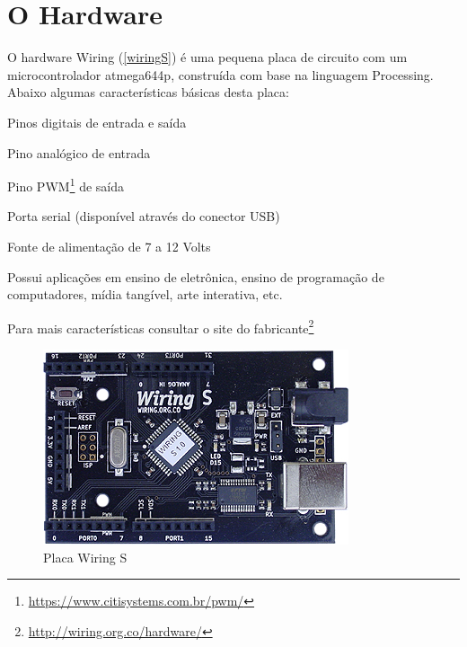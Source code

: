 \section[O Hardware]{O Hardware}

O hardware Wiring (\autoref{wiringS}) é uma pequena placa de circuito com um microcontrolador atmega644p, construída com base na linguagem Processing. Abaixo algumas características básicas desta placa: 

\begin{alineas}
    \item Pinos digitais de entrada e saída
    \item Pino analógico de entrada
    \item Pino PWM\footnote{\url{https://www.citisystems.com.br/pwm/}} de saída
    \item Porta serial (disponível através do conector USB)
    \item Fonte de alimentação de 7 a 12 Volts
\end{alineas}

Possui aplicações em ensino de eletrônica, ensino de programação de computadores, mídia tangível, arte interativa, etc.

Para mais características consultar o site do fabricante\footnote{\url{http://wiring.org.co/hardware/}}

\begin{figure}[htb]
	\caption{\label{wiringS}Placa Wiring S}
	\begin{center}
	    \includegraphics[scale=0.9]{artigo/refs/Rogue_BB_WRS}
	\end{center}
\end{figure}